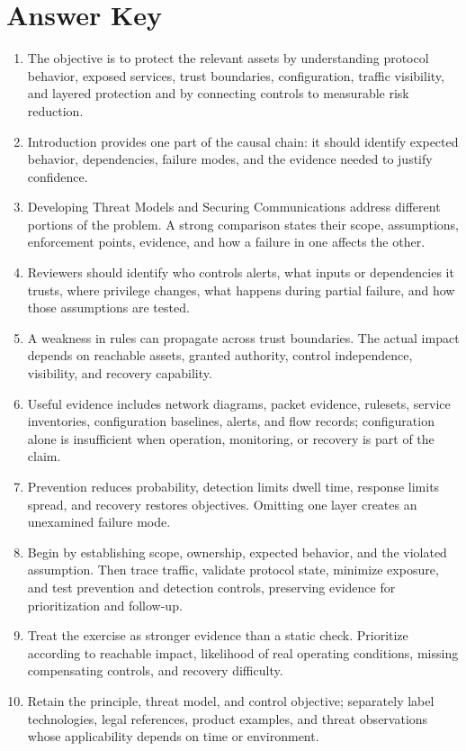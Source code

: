 \documentclass[11pt]{article}
\begin{document}
\section*{Answer Key}
\begin{enumerate}
\item The objective is to protect the relevant assets by understanding protocol behavior, exposed services, trust boundaries, configuration, traffic visibility, and layered protection and by connecting controls to measurable risk reduction.
\item Introduction provides one part of the causal chain: it should identify expected behavior, dependencies, failure modes, and the evidence needed to justify confidence.
\item Developing Threat Models and Securing Communications address different portions of the problem. A strong comparison states their scope, assumptions, enforcement points, evidence, and how a failure in one affects the other.
\item Reviewers should identify who controls alerts, what inputs or dependencies it trusts, where privilege changes, what happens during partial failure, and how those assumptions are tested.
\item A weakness in rules can propagate across trust boundaries. The actual impact depends on reachable assets, granted authority, control independence, visibility, and recovery capability.
\item Useful evidence includes network diagrams, packet evidence, rulesets, service inventories, configuration baselines, alerts, and flow records; configuration alone is insufficient when operation, monitoring, or recovery is part of the claim.
\item Prevention reduces probability, detection limits dwell time, response limits spread, and recovery restores objectives. Omitting one layer creates an unexamined failure mode.
\item Begin by establishing scope, ownership, expected behavior, and the violated assumption. Then trace traffic, validate protocol state, minimize exposure, and test prevention and detection controls, preserving evidence for prioritization and follow-up.
\item Treat the exercise as stronger evidence than a static check. Prioritize according to reachable impact, likelihood of real operating conditions, missing compensating controls, and recovery difficulty.
\item Retain the principle, threat model, and control objective; separately label technologies, legal references, product examples, and threat observations whose applicability depends on time or environment.
\end{enumerate}
\end{document}
